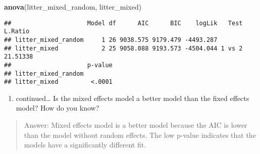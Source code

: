 \documentclass[]{article}
\newenvironment{Shaded}{\begin{snugshade}}{\end{snugshade}}
\newcommand{\KeywordTok}[1]{\textcolor[rgb]{0.13,0.29,0.53}{\textbf{#1}}}
\newcommand{\NormalTok}[1]{#1}
\providecommand{\tightlist}{%
  \setlength{\itemsep}{0pt}\setlength{\parskip}{0pt}}
\begin{document}
\begin{Shaded}
\begin{Highlighting}[]
\KeywordTok{anova}\NormalTok{(litter_mixed_random, litter_mixed)}
\end{Highlighting}
\end{Shaded}

\begin{verbatim}
##                     Model df      AIC      BIC    logLik   Test  L.Ratio
## litter_mixed_random     1 26 9038.575 9179.479 -4493.287                
## litter_mixed            2 25 9058.088 9193.573 -4504.044 1 vs 2 21.51338
##                     p-value
## litter_mixed_random        
## litter_mixed         <.0001
\end{verbatim}

\begin{enumerate}
\def\labelenumi{\alph{enumi}.}
\setcounter{enumi}{3}
\tightlist
\item
  continued\ldots{} Is the mixed effects model a better model than the
  fixed effects model? How do you know?
\end{enumerate}

\begin{quote}
Answer: Mixed effects model is a better model because the AIC is lower
than the model without random effects. The low p-value indicates that
the models have a significantly different fit.
\end{quote}
\end{document}

